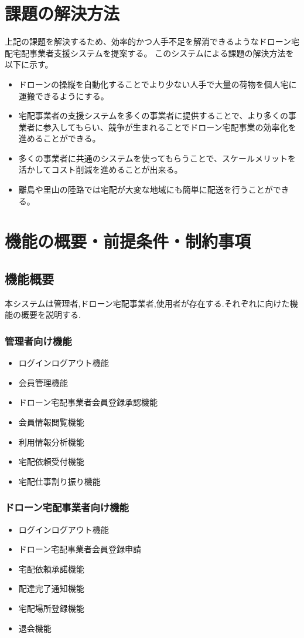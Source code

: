 \documentclass[a4paper, titlepage]{jsarticle}
\begin{document}
\section{課題の解決方法}
上記の課題を解決するため、効率的かつ人手不足を解消できるようなドローン宅配宅配事業者支援システムを提案する。
このシステムによる課題の解決方法を以下に示す。
\begin{itemize}
    \item ドローンの操縦を自動化することでより少ない人手で大量の荷物を個人宅に運搬できるようにする。
    \item 宅配事業者の支援システムを多くの事業者に提供することで、より多くの事業者に参入してもらい、競争が生まれることでドローン宅配事業の効率化を進めることができる。
    \item 多くの事業者に共通のシステムを使ってもらうことで、スケールメリットを活かしてコスト削減を進めることが出来る。
    \item 離島や里山の陸路では宅配が大変な地域にも簡単に配送を行うことができる。
\end{itemize}

\section{機能の概要・前提条件・制約事項}
\subsection{機能概要}
本システムは管理者,ドローン宅配事業者,使用者が存在する.それぞれに向けた機能の概要を説明する.
\subsubsection{管理者向け機能}
\begin{itemize}
    \item ログインログアウト機能
    \item 会員管理機能
    \item ドローン宅配事業者会員登録承認機能
    \item 会員情報閲覧機能
    \item 利用情報分析機能
    \item 宅配依頼受付機能
    \item 宅配仕事割り振り機能
\end{itemize}
\subsubsection{ドローン宅配事業者向け機能}
\begin{itemize}
    \item ログインログアウト機能
    \item ドローン宅配事業者会員登録申請
    \item 宅配依頼承諾機能
    \item 配達完了通知機能
    \item 宅配場所登録機能
    \item 退会機能
\end{itemize}
\end{document}
